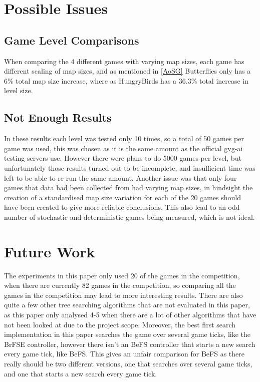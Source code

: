 \documentclass[journal]{IEEEtran}
\begin{document}
	





\section{Possible Issues}\label{issues}
	\subsection{Game Level Comparisons}
		When comparing the 4 different games with varying map sizes, each game has different scaling of map sizes, and as mentioned in \ref{AoSG} Butterflies only has a 6\% total map size increase, where as HungryBirds has a 36.3\% total increase in level size.

	\subsection{Not Enough Results}
		In these results each level was tested only 10 times, so a total of 50 games per game was used, this was chosen as it is the same amount as the official gvg-ai testing servers use. However there were plans to do 5000 games per level, but unfortunately those results turned out to be incomplete, and insufficient time was left to be able to re-run the same amount. 
		Another issue was that only four games that data had been collected from had varying map sizes, in hindsight the creation of a standardised map size variation for each of the 20 games should have been created to give more reliable conclusions.
		This also lead to an odd number of stochastic and deterministic games being measured, which is not ideal.







\section{Future Work}

The experiments in this paper only used 20 of the games in the competition, when there are currently 82 games in the competition, so comparing all the games in the competition may lead to more interesting results.
There are also quite a few other tree searching algorithms that are not evaluated in this paper, as this paper only analysed 4-5 when there are a lot of other algorithms that have not been looked at due to the project scope.
Moreover, the best first search implementation in this paper searches the game over several game ticks, like the BrFSE controller, however there isn't an BeFS controller that starts a new search every game tick, like BeFS. This gives an unfair comparison for BeFS as there really should be two different versions, one that searches over several game ticks, and one that starts a new search every game tick.
\end{document}
